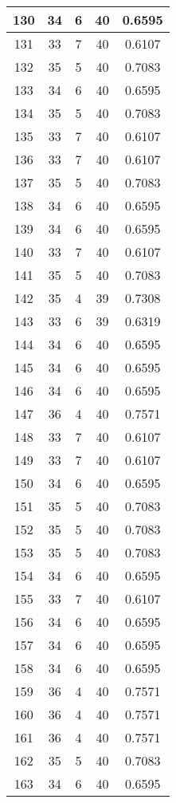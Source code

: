 \documentclass[letterpaper, 12pt]{article}
\begin{document}
\begin{longtable}{|c|c|c|c|c|}
\hline
130 & 34 & 6 & 40 & 0.6595 \\
\hline
131 & 33 & 7 & 40 & 0.6107 \\
\hline
132 & 35 & 5 & 40 & 0.7083 \\
\hline
133 & 34 & 6 & 40 & 0.6595 \\
\hline
134 & 35 & 5 & 40 & 0.7083 \\
\hline
135 & 33 & 7 & 40 & 0.6107 \\
\hline
136 & 33 & 7 & 40 & 0.6107 \\
\hline
137 & 35 & 5 & 40 & 0.7083 \\
\hline
138 & 34 & 6 & 40 & 0.6595 \\
\hline
139 & 34 & 6 & 40 & 0.6595 \\
\hline
140 & 33 & 7 & 40 & 0.6107 \\
\hline
141 & 35 & 5 & 40 & 0.7083 \\
\hline
142 & 35 & 4 & 39 & 0.7308 \\
\hline
143 & 33 & 6 & 39 & 0.6319 \\
\hline
144 & 34 & 6 & 40 & 0.6595 \\
\hline
145 & 34 & 6 & 40 & 0.6595 \\
\hline
146 & 34 & 6 & 40 & 0.6595 \\
\hline
147 & 36 & 4 & 40 & 0.7571 \\
\hline
148 & 33 & 7 & 40 & 0.6107 \\
\hline
149 & 33 & 7 & 40 & 0.6107 \\
\hline
150 & 34 & 6 & 40 & 0.6595 \\
\hline
151 & 35 & 5 & 40 & 0.7083 \\
\hline
152 & 35 & 5 & 40 & 0.7083 \\
\hline
153 & 35 & 5 & 40 & 0.7083 \\
\hline
154 & 34 & 6 & 40 & 0.6595 \\
\hline
155 & 33 & 7 & 40 & 0.6107 \\
\hline
156 & 34 & 6 & 40 & 0.6595 \\
\hline
157 & 34 & 6 & 40 & 0.6595 \\
\hline
158 & 34 & 6 & 40 & 0.6595 \\
\hline
159 & 36 & 4 & 40 & 0.7571 \\
\hline
160 & 36 & 4 & 40 & 0.7571 \\
\hline
161 & 36 & 4 & 40 & 0.7571 \\
\hline
162 & 35 & 5 & 40 & 0.7083 \\
\hline
163 & 34 & 6 & 40 & 0.6595 \\

\end{longtable}
\end{document}
